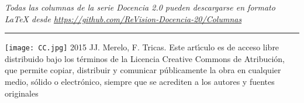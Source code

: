 \documentclass[twoside,10pt]{article}
\begin{document}
\begin{multicols}{2}
\bigskip

\noindent\emph{Todas las columnas de la serie Docencia 2.0
pueden descargarse en formato LaTeX desde
{\small\url{https://github.com/ReVision-Docencia-20/Columnas}}}

\noindent\rule{90mm}{1pt}

{\small \noindent\texttt{[image: CC.jpg]} 2015 JJ. Merelo, F. Tricas. Este art\'{\i}culo es de acceso libre distribuido bajo los t\'erminos
de la Licencia Creative Commons de Atribuci\'on, que permite copiar,
distribuir y comunicar p\'ublicamente la obra en cualquier medio, s\'olido
o electr\'onico, siempre que se acrediten a los autores y fuentes
originales}

\end{multicols}
\end{document}
